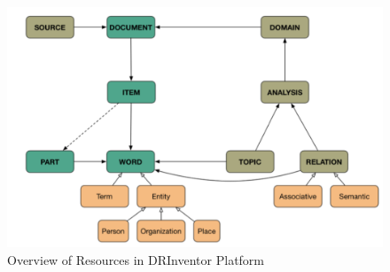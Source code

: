 \begin{figure}[ht]
    \centering
    \includegraphics[width=0.8\linewidth]{drinventor-model.png}
    \caption{Overview of Resources in DRInventor Platform}
    \label{fig:drinventor-model}
\end{figure}


